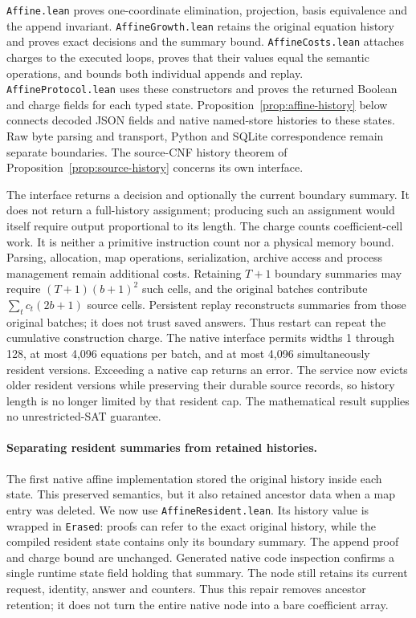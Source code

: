 \documentclass[11pt,a4paper]{article}
\numberwithin{equation}{section}
\theoremstyle{plain}
\theoremstyle{definition}
\theoremstyle{remark}
\begin{document}
\texttt{Affine.lean} proves one-coordinate elimination, projection, basis equivalence and the append invariant. \texttt{AffineGrowth.lean} retains the original equation history and proves exact decisions and the summary bound. \texttt{AffineCosts.lean} attaches charges to the executed loops, proves that their values equal the semantic operations, and bounds both individual appends and replay. \texttt{AffineProtocol.lean} uses these constructors and proves the returned Boolean and charge fields for each typed state. Proposition~\ref{prop:affine-history} below connects decoded JSON fields and native named-store histories to these states. Raw byte parsing and transport, Python and SQLite correspondence remain separate boundaries. The source-CNF history theorem of Proposition~\ref{prop:source-history} concerns its own interface.

The interface returns a decision and optionally the current boundary summary. It does not return a full-history assignment; producing such an assignment would itself require output proportional to its length. The charge counts coefficient-cell work. It is neither a primitive instruction count nor a physical memory bound. Parsing, allocation, map operations, serialization, archive access and process management remain additional costs. Retaining $T+1$ boundary summaries may require $(T+1)(b+1)^2$ such cells, and the original batches contribute $\sum_t c_t(2b+1)$ source cells. Persistent replay reconstructs summaries from those original batches; it does not trust saved answers. Thus restart can repeat the cumulative construction charge. The native interface permits widths 1 through 128, at most 4,096 equations per batch, and at most 4,096 simultaneously resident versions. Exceeding a native cap returns an error. The service now evicts older resident versions while preserving their durable source records, so history length is no longer limited by that resident cap. The mathematical result supplies no unrestricted-SAT guarantee.

\paragraph{Separating resident summaries from retained histories.}
The first native affine implementation stored the original history inside each state. This preserved semantics, but it also retained ancestor data when a map entry was deleted. We now use \texttt{AffineResident.lean}. Its history value is wrapped in \texttt{Erased}: proofs can refer to the exact original history, while the compiled resident state contains only its boundary summary. The append proof and charge bound are unchanged. Generated native code inspection confirms a single runtime state field holding that summary. The node still retains its current request, identity, answer and counters. Thus this repair removes ancestor retention; it does not turn the entire native node into a bare coefficient array.
\end{document}
